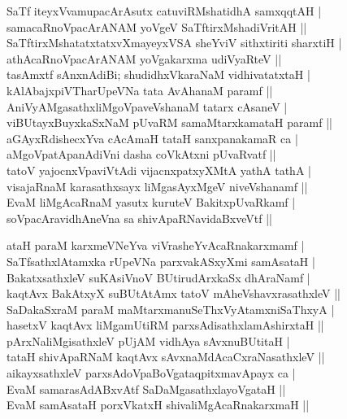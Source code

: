 \begin{entry}
\begin{shl}
SaTf iteyxVvamupacArAsutx catuviRMshatidhA samxqqtAH |\\
samacaRnoVpacArANAM yoVgeV SaTftirxMshadiVritAH ||\\
SaTftirxMshatatxtatxvXmayeyxVSA sheYviV sithxtiriti sharxtiH |\\
athAcaRnoVpacArANAM yoVgakarxma udiVyaRteV ||\\
tasAmxtf sAnxnAdiBi; shudidhxVkaraNaM vidhivatatxtaH |\\
kAlAbajxpiVTharUpeVNa tata AvAhanaM paramf ||\\
AniVyAMgasathxliMgoVpaveVshanaM tatarx cAsaneV |\\
viBUtayxBuyxkaSxNaM pUvaRM samaMtarxkamataH paramf ||\\
aGAyxRdishecxYva cAcAmaH tataH sanxpanakamaR ca |\\
aMgoVpatApanAdiVni dasha coVkAtxni pUvaRvatf ||\\
tatoV yajocnxVpaviVtAdi vijacnxpatxyXMtA yathA tathA |\\
visajaRnaM karasathxsayx liMgasAyxMgeV niveVshanamf ||\\
EvaM liMgAcaRnaM yasutx kuruteV BakitxpUvaRkamf |\\
soVpacAravidhAneVna sa shivApaRNavidaBxveVtf ||
\end{shl}
\smallskip
{}
\smallskip
{}
\smallskip
\begin{shl}
ataH paraM karxmeVNeYva viVrasheYvAcaRnakarxmamf |\\
SaTfsathxlAtamxka rUpeVNa parxvakASxyXmi samAsataH |\\
BakatxsathxleV suKAsiVnoV BUtirudArxkaSx dhAraNamf |\\
kaqtAvx BakAtxyX suBUtAtAmx tatoV mAheVshavxrasathxleV ||\\
SaDakaSxraM paraM maMtarxmanuSeThxVyAtamxniSaThxyA |\\
hasetxV kaqtAvx liMgamUtiRM parxsAdisathxlamAshirxtaH ||\\
pArxNaliMgisathxleV pUjAM vidhAya sAvxnuBUtitaH |\\
tataH shivApaRNaM kaqtAvx sAvxnaMdAcaCxraNasathxleV ||\\
aikayxsathxleV parxsAdoVpaBoVgataqpitxmavApayx ca |\\
EvaM samarasAdABxvAtf SaDaMgasathxlayoVgataH ||\\
EvaM samAsataH porxVkatxH shivaliMgAcaRnakarxmaH ||
\end{shl}
\smallskip
{}
\smallskip
{}
\end{entry}

